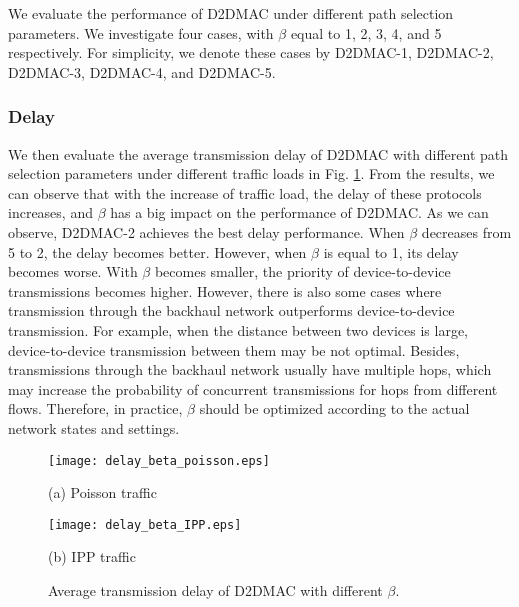\documentclass[journal]{IEEEtran}
\begin{document}
We evaluate the performance of D2DMAC under different path selection parameters. We investigate
four cases, with $\beta$ equal to 1, 2, 3, 4, and 5 respectively. For simplicity, we denote these
cases by D2DMAC-1, D2DMAC-2, D2DMAC-3, D2DMAC-4, and D2DMAC-5.

\subsubsection{Delay}

We then evaluate the average transmission delay of D2DMAC with different path selection parameters
under different traffic loads in Fig. \ref{fig:delay_beta}. From the results, we can observe that
with the increase of traffic load, the delay of these protocols increases, and $\beta$ has a big
impact on the performance of D2DMAC. As we can observe, D2DMAC-2 achieves the best delay
performance. When $\beta$ decreases from 5 to 2, the delay becomes better. However, when $\beta$ is
equal to 1, its delay becomes worse. With $\beta$ becomes smaller, the priority of device-to-device
transmissions becomes higher. However, there is also some cases where transmission through the
backhaul network outperforms device-to-device transmission. For example, when the distance between
two devices is large, device-to-device transmission between them may be not optimal. Besides,
transmissions through the backhaul network usually have multiple hops, which may increase the
probability of concurrent transmissions for hops from different flows. Therefore, in practice,
$\beta$ should be optimized according to the actual network states and settings.







\begin{figure}[htbp]
\begin{minipage}[t]{0.5\linewidth}
\centering
\texttt{[image: delay\_beta\_poisson.eps]}
\centerline{\small (a) Poisson traffic}
\end{minipage}\begin{minipage}[t]{0.5\linewidth}
\centering
\texttt{[image: delay\_beta\_IPP.eps]}
\centerline{\small (b) IPP traffic}
\end{minipage}\caption{Average transmission delay of D2DMAC with different $\beta$.}
\label{fig:delay_beta} \vspace*{-3mm}
\end{figure}
\end{document}
